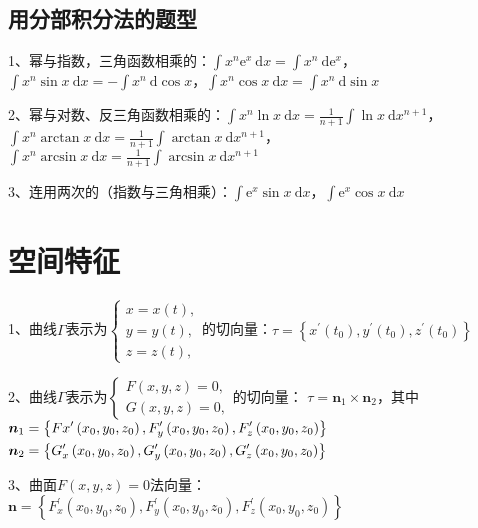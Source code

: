 \subsection{用分部积分法的题型}

1、幂与指数，三角函数相乘的：$\int x^{n} \mathrm{e}^{x} \mathrm{~d} x=\int x^{n} \mathrm{~d} \mathrm{e}^{x}$，$\int x^{n} \sin x \mathrm{~d} x=-\int x^{n} \mathrm{~d} \cos x$，$\int x^{n} \cos x \mathrm{~d} x=\int x^{n} \mathrm{~d} \sin x$

2、幂与对数、反三角函数相乘的：$\int x^{n} \ln x \mathrm{~d} x=\frac{1}{n+1} \int \ln x \mathrm{~d} x^{n+1}$，$\int x^{n} \arctan x \mathrm{~d} x=\frac{1}{n+1} \int \arctan x \mathrm{~d} x^{n+1}$，$\int x^{n} \arcsin x \mathrm{~d} x=\frac{1}{n+1} \int \arcsin x \mathrm{~d} x^{n+1}$

3、连用两次的（指数与三角相乘）：$\int \mathrm{e}^{x} \sin x \mathrm{~d} x$，$\int \mathrm{e}^{x} \cos x \mathrm{~d} x$

\section{空间特征}

1、曲线$\Gamma$表示为$\left\{\begin{array}{l}x=x(t), \\ y=y(t),  \\ z=z(t),\end{array}\right.$的切向量：$\tau=\left\{x^{\prime}\left(t_{0}\right), y^{\prime}\left(t_{0}\right), z^{\prime}\left(t_{0}\right)\right\}$

2、曲线$\Gamma$表示为$\left\{\begin{array}{l}F(x, y, z)=0,\\ G(x, y, z)=0,\end{array}\right.$的切向量： $\tau=\boldsymbol{n}_{1} \times \boldsymbol{n}_{2}$，其中$\newline\begin{aligned} &\boldsymbol{n}_{1}=\left\{F{x}^{\prime}\left(x_{0}, y_{0}, z_{0}\right), F_{y}^{\prime}\left(x_{0}, y_{0}, z_{0}\right), F_{z}^{\prime}\left(x_{0}, y_{0}, z_{0}\right)\right\} \\ &\boldsymbol{n}_{2}=\left\{G_{x}^{\prime}\left(x_{0}, y_{0}, z_{0}\right), G_{y}^{\prime}\left(x_{0}, y_{0}, z_{0}\right), G_{z}^{\prime}\left(x_{0}, y_{0}, z_{0}\right)\right\} \end{aligned}$

3、曲面$F(x, y, z)=0$法向量：$\boldsymbol{n}=\left\{F_{x}^{\prime}\left(x_{0}, y_{0}, z_{0}\right), F_{y}^{\prime}\left(x_{0}, y_{0}, z_{0}\right), F_{z}^{\prime}\left(x_{0}, y_{0}, z_{0}\right)\right\}$

